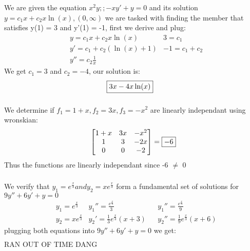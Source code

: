 \documentclass{article}
\begin{document}
\subsubsection{}
We are given the equation $ x^2y;; - xy' + y = 0$ and its solution $ y = c_1x + c_2x \ln(x), (0, \infty)$ we are tasked with finding the member that satisfies y(1) = 3 and y'(1) = -1, first we derive and plug:
\begin{align*}
    & y = c_1x + c_2x\ln(x) & 3 = c_1\\
    & y' = c_1 + c_2(\ln(x) + 1) & -1 = c_1 + c_2\\
    & y'' = c_2 \frac{1}{x} 
\end{align*}
We get $c_1 = 3$ and $c_2 = -4$, our solution is:
\begin{align*}
    \Aboxed{3x -4x\ln(x)}
\end{align*}


\subsubsection{} 
We determine if $f_1 = 1 + x, f_2 = 3x, f_3 = -x^2$ are linearly independant using wronskian:
\begin{equation}
\begin{bmatrix}
    1+x & 3x & -x^2\\
    1 & 3 & -2x \\
    0 & 0 & - 2
\end{bmatrix}
  = \boxed{ -6} \\
\end{equation}
Thus the functions are linearly independant since -6 $\not=$ 0

\subsubsection{}
We verify that $y_1 = e^{\frac{x}{3}} and y_2 = xe^{\frac{x}{3}}$ form a fundamental set of solutions for $ 9y'' +6y' + y = 0$
\begin{align*}
    & y_1 = e^{\frac{x}{3}} & y_1'' = \frac{e^{\frac{x}{3}}}{3} && y_1'' = \frac{e^{\frac{x}{3}}}{9} \\
    & y_2 = xe^{\frac{x}{3}} & y_2'= \frac{1}{3} e^{\frac{x}{3}}(x+3) && y_2'' = \frac{1}{9} e^{\frac{x}{3}}(x+6) 
\end{align*}
plugging both equations into $ 9y'' +6y' + y = 0$ we get:
\begin{align*}
\end{align*}
RAN OUT OF TIME DANG
\end{document}
